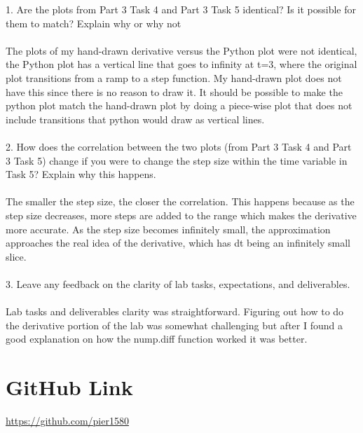 1. Are the plots from Part 3 Task 4 and Part 3 Task 5 identical? Is it possible for them to match? Explain why or why not
\\ \\
The plots of my hand-drawn derivative versus the Python plot were not identical, the Python plot has a vertical line that goes to infinity at t=3, where the original plot transitions from a ramp to a step function.  My hand-drawn plot does not have this since there is no reason to draw it.  It should be possible to make the python plot match the hand-drawn plot by doing a piece-wise plot that does not include transitions that python would draw as vertical lines.
\\ \\ 
2. How does the correlation between the two plots (from Part 3 Task 4 and Part 3 Task 5) change if you were to change the step size within the time variable in Task 5? Explain why this happens.
\\ \\ 
The smaller the step size, the closer the correlation.  This happens because as the step size decreases, more steps are added to the range which makes the derivative more accurate.  As the step size becomes infinitely small, the approximation approaches the real idea of the derivative, which has dt being an infinitely small slice.
\\ \\
3. Leave any feedback on the clarity of lab tasks, expectations, and deliverables.
\\ \\
Lab tasks and deliverables clarity was straightforward.  Figuring out how to do the derivative portion of the lab was somewhat challenging but after I found a good explanation on how the nump.diff function worked it was better.

\section{GitHub Link}
\url{https://github.com/pier1580}
